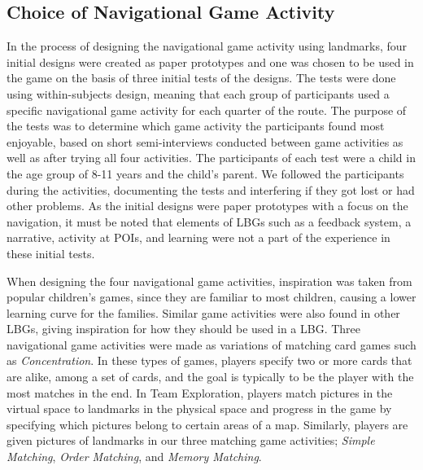 \subsection{Choice of Navigational Game Activity}
In the process of designing the navigational game activity using landmarks, four initial designs were created as paper prototypes and one was chosen to be used in the game on the basis of three initial tests of the designs. The tests were done using within-subjects design, meaning that each group of participants used a specific navigational game activity for each quarter of the route. The purpose of the tests was to determine which game activity the participants found most enjoyable, based on short semi-interviews conducted between game activities as well as after trying all four activities. The participants of each test were a child in the age group of 8-11 years and the child's parent. We followed the participants during the activities, documenting the tests and interfering if they got lost or had other problems. As the initial designs were paper prototypes with a focus on the navigation, it must be noted that elements of LBGs such as a feedback system, a narrative, activity at POIs, and learning were not a part of the experience in these initial tests.

When designing the four navigational game activities, inspiration was taken from popular children's games, since they are familiar to most children, causing a lower learning curve for the families. Similar game activities were also found in other LBGs, giving inspiration for how they should be used in a LBG. Three navigational game activities were made as variations of matching card games such as \textit{Concentration}\cite{childrensGames}. In these types of games, players specify two or more cards that are alike, among a set of cards, and the goal is typically to be the player with the most matches in the end. In Team Exploration\cite{GamingOnTheMove}, players match pictures in the virtual space to landmarks in the physical space and progress in the game by specifying which pictures belong to certain areas of a map. Similarly, players are given pictures of landmarks in our three matching game activities; \textit{Simple Matching}, \textit{Order Matching}, and \textit{Memory Matching}.

